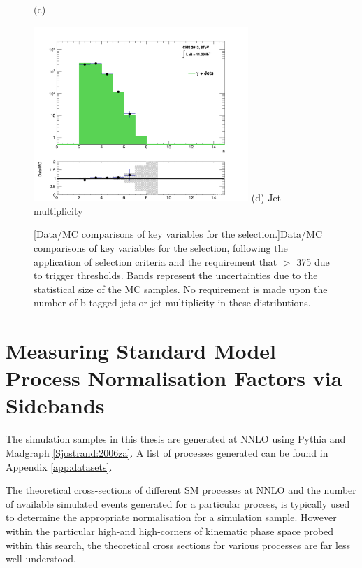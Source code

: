 \begin{itemize}
\begin{figure}[ht]
\begin{minipage}{.48\textwidth}
$\text{(c}$) \alphat
\end{minipage}
\begin{minipage}{.48\textwidth}
\centering
\includegraphics[width = 3.2in]{plots/photon_njet_datamc.pdf}
(d) Jet multiplicity
\end{minipage}
[Data/MC comparisons of key variables for the \gpjets selection.]{Data/MC comparisons of key variables for the \gpjets selection, following the application of selection criteria and the requirement that \theht $>$ 375 \GeV due to trigger thresholds. Bands represent the uncertainties due to the statistical size of the MC samples. No requirement is made upon the number of b-tagged jets or jet multiplicity in these distributions.}\label{fig:photonmcplots}
\end{figure}

\end{itemize}


\section{Measuring Standard Model Process Normalisation Factors via \theht Sidebands}
\label{subsec:mckfactors}

The simulation samples in this thesis are generated at \acf{NNLO} using Pythia and Madgraph \ref{Sjostrand:2006za}. A list of processes generated can be found in Appendix \ref{app:datasets}. 

The theoretical cross-sections of different \ac{SM} processes at \acf{NNLO} and the number of available simulated events generated for a particular process, is typically used to determine the appropriate normalisation for a simulation sample. However within the particular high-\theht and high-\met corners of kinematic phase space probed within this search, the theoretical cross sections for various processes are far less well understood. 

